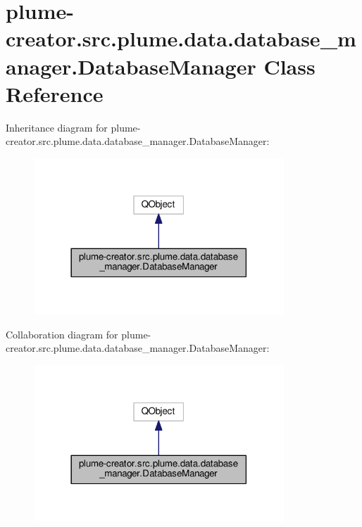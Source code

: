 \hypertarget{classplume-creator_1_1src_1_1plume_1_1data_1_1database__manager_1_1_database_manager}{}\section{plume-\/creator.src.\+plume.\+data.\+database\+\_\+manager.\+Database\+Manager Class Reference}
\label{classplume-creator_1_1src_1_1plume_1_1data_1_1database__manager_1_1_database_manager}


Inheritance diagram for plume-\/creator.src.\+plume.\+data.\+database\+\_\+manager.\+Database\+Manager\+:\nopagebreak
\begin{figure}[H]
\begin{center}
\leavevmode
\includegraphics[width=266pt]{classplume-creator_1_1src_1_1plume_1_1data_1_1database__manager_1_1_database_manager__inherit__graph}
\end{center}
\end{figure}


Collaboration diagram for plume-\/creator.src.\+plume.\+data.\+database\+\_\+manager.\+Database\+Manager\+:\nopagebreak
\begin{figure}[H]
\begin{center}
\leavevmode
\includegraphics[width=266pt]{classplume-creator_1_1src_1_1plume_1_1data_1_1database__manager_1_1_database_manager__coll__graph}
\end{center}
\end{figure}
